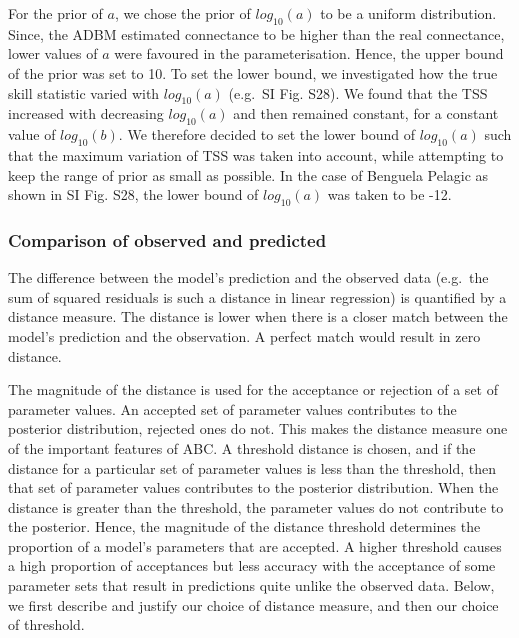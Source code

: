 \documentclass{article}
\begin{document}
For the prior of \(a\), we chose the prior of \(log_{10}(a)\) to be a
uniform distribution. Since, the ADBM estimated connectance to be higher
than the real connectance, lower values of \(a\) were favoured in the
parameterisation. Hence, the upper bound of the prior was set to 10. To
set the lower bound, we investigated how the true skill statistic varied
with \(log_{10}(a)\) (e.g.~SI Fig. S28). We found that the TSS increased
with decreasing \(log_{10}(a)\) and then remained constant, for a
constant value of \(log_{10}(b)\). We therefore decided to set the lower
bound of \(log_{10}(a)\) such that the maximum variation of TSS was
taken into account, while attempting to keep the range of prior as small
as possible. In the case of Benguela Pelagic as shown in SI Fig. S28,
the lower bound of \(log_{10}(a)\) was taken to be -12.

\hypertarget{comparison-of-observed-and-predicted}{%
\subsubsection{Comparison of observed and
predicted}\label{comparison-of-observed-and-predicted}}

The difference between the model's prediction and the observed data
(e.g.~the sum of squared residuals is such a distance in linear
regression) is quantified by a distance measure. The distance is lower
when there is a closer match between the model's prediction and the
observation. A perfect match would result in zero distance.

The magnitude of the distance is used for the acceptance or rejection of
a set of parameter values. An accepted set of parameter values
contributes to the posterior distribution, rejected ones do not. This
makes the distance measure one of the important features of ABC. A
threshold distance is chosen, and if the distance for a particular set
of parameter values is less than the threshold, then that set of
parameter values contributes to the posterior distribution. When the
distance is greater than the threshold, the parameter values do not
contribute to the posterior. Hence, the magnitude of the distance
threshold determines the proportion of a model's parameters that are
accepted. A higher threshold causes a high proportion of acceptances but
less accuracy with the acceptance of some parameter sets that result in
predictions quite unlike the observed data. Below, we first describe and
justify our choice of distance measure, and then our choice of
threshold.
\end{document}
